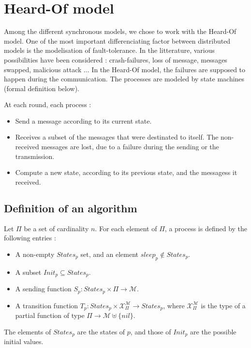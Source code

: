 \documentclass{article}
\begin{document}
\section{Heard-Of model}

Among the different synchronous models, we chose to work with the Heard-Of model.
One of the most important differenciating factor between distributed models is the modelisation of fault-tolerance.
In the litterature, various possibilities have been considered : crash-failures, loss of message, messages swapped, malicious attack ...
In the Heard-Of model, the failures are supposed to happen during the communication.
The processes are modeled by state machines (formal definition below).

At each round, each process :
\begin{itemize}
	\item Send a message according to its current state.
	\item Receives a subset of the messages that were destinated to itself. The non-received messages are lost, due to a failure during the sending or the transmission.
	\item Compute a new state, according to its previous state, and the messagess it received.
\end{itemize}

\subsection{Definition of an algorithm}

Let $\Pi$ be a set of cardinality $n$. For each element of $\Pi$, a process is defined by the following entries :

\begin{itemize}
	\item A non-empty $States_p$ set, and an element $sleep_p \notin States_p$.
	\item A subset $Init_p \subseteq States_p$.
	\item A sending function $S_p : States_p \times \Pi \rightarrow \mathcal{M}$.
	\item A transition function $T_p : States_p \times \mathcal{X}_\Pi^{\mathcal{M}} \rightarrow States_p$,
		where $\mathcal{X}_\Pi^{\mathcal{M}}$ is the type of a partial function
		of type $\Pi \rightarrow \mathcal{M} \uplus \{nil\}$.
\end{itemize}

The elements of $States_p$ are the states of $p$, and those of $Init_p$ are the possible initial values.
\end{document}
